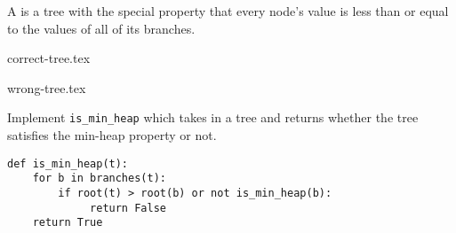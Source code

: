 \begin{blocksection}
\question A  is a tree with the special property that every node's value is
less than or equal to the values of all of its branches.

\vspace{\parskip}
\begin{minipage}{0.5\linewidth}
\centering
{correct-tree.tex}
\end{minipage}
\begin{minipage}{0.5\linewidth}
\centering
{wrong-tree.tex}
\end{minipage}
\vspace{\parskip}

Implement \lstinline$is_min_heap$ which takes in a tree and returns whether the tree satisfies
the min-heap property or not.

\begin{solution}[1.5in]
\begin{lstlisting}
def is_min_heap(t):
    for b in branches(t):
        if root(t) > root(b) or not is_min_heap(b):
             return False
    return True
\end{lstlisting}
\end{solution}
\end{blocksection}
